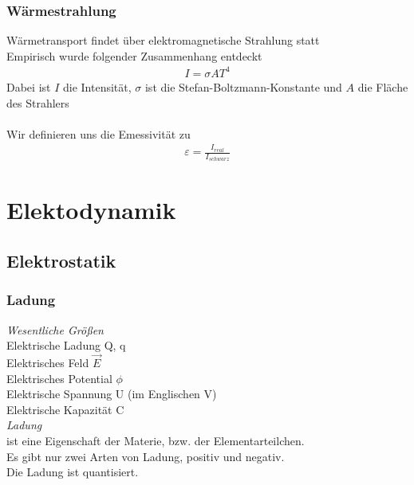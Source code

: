 \documentclass[a4paper,12pt]{report}
\begin{document}
\subsection{Wärmestrahlung}
Wärmetransport findet über elektromagnetische Strahlung statt \\
Empirisch wurde folgender Zusammenhang entdeckt
\begin{align}
I = \sigma A T^4
\end{align}
Dabei ist $I$ die Intensität, $\sigma$ ist die Stefan-Boltzmann-Konstante und $A$ die Fläche des Strahlers \\
\\
Wir definieren uns die Emessivität zu 
\begin{align}
\varepsilon = \frac{I_{real}}{I_{schwarz}}
\end{align}












\newpage

\chapter{Elektodynamik}
\section{Elektrostatik}

\subsection{Ladung}

\emph{Wesentliche Größen}\\


Elektrische Ladung		Q, q\\
Elektrisches Feld 		$ \vec{E} $\\
Elektrisches Potential		$ \phi $\\
Elektrische Spannung		U 	(im Englischen V)\\
Elektrische Kapazität		C\\


\emph {Ladung}\\

ist eine Eigenschaft der Materie, bzw. der Elementarteilchen.\\
Es gibt nur zwei Arten von Ladung, positiv und negativ.\\
Die Ladung ist quantisiert.\\
\end{document}

